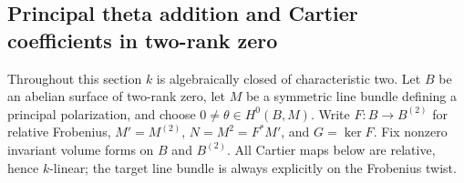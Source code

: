 \subsection{Principal theta addition and Cartier coefficients in two-rank zero}
\label{subsec:principal-theta-Cartier-bridge}

Throughout this section \(k\) is algebraically closed of characteristic
two.  Let \(B\) be an abelian surface of two-rank zero, let \(M\) be a
symmetric line bundle defining a principal polarization, and choose
\(0\ne\theta\in H^0(B,M)\).  Write
\(F:B\to B^{(2)}\) for relative Frobenius, \(M'=M^{(2)}\),
\(N=M^2=F^*M'\), and \(G=\ker F\).
Fix nonzero invariant volume forms on \(B\) and \(B^{(2)}\).
All Cartier maps below are relative, hence \(k\)-linear; the target
line bundle is always explicitly on the Frobenius twist.

